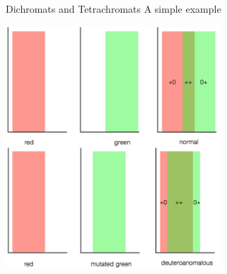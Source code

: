\documentclass{beamer}
\begin{document}
\begin{frame}{Dichromats and Tetrachromats}
A simple example
   \begin{center}
      \includegraphics[width=0.6\textwidth]{figures/redgreenbars.png}
   \end{center}
\end{frame}
\end{document}
